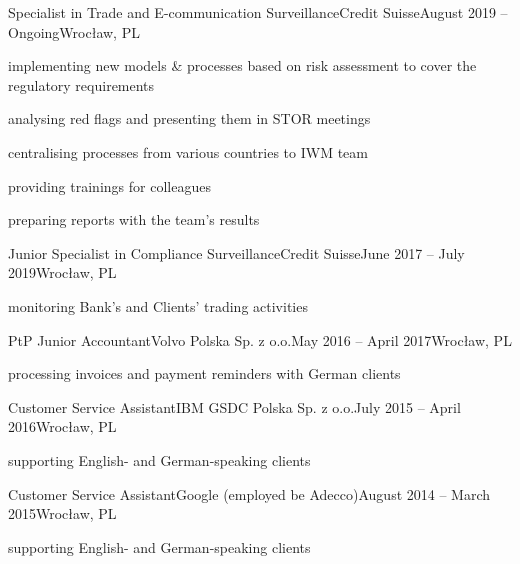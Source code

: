 
\begin{cveventi}{Specialist in Trade and E-communication Surveillance}{Credit Suisse}{August 2019 -- Ongoing}{Wroc\l aw, PL}
	\item implementing new models \& processes based on risk assessment to cover the regulatory requirements
	\item analysing red flags and presenting them in STOR meetings
	\item centralising processes from various countries to IWM team
	\item providing trainings for colleagues
	\item preparing reports with the team's results
\end{cveventi}
%
\divider
\begin{cveventis}{Junior Specialist in Compliance Surveillance}{Credit Suisse}{June 2017 -- July 2019}{Wroc\l aw, PL}
	\item monitoring Bank’s and Clients' trading activities
\end{cveventis}
%
\divider
%
\begin{cveventis}{PtP Junior Accountant}{Volvo Polska Sp. z o.o.}{May 2016 -- April 2017}{Wroc\l aw, PL}
	\item processing invoices and payment reminders with German clients
\end{cveventis}
%
\divider
%
\begin{cveventis}{Customer Service Assistant}{IBM GSDC Polska Sp. z o.o.}{July 2015 -- April 2016}{Wroc\l aw, PL}
	\item supporting English- and German-speaking clients
\end{cveventis}
%
\divider
%
\begin{cveventis}{Customer Service Assistant}{Google (employed be Adecco)}{August 2014 -- March 2015}{Wroc\l aw, PL}
	\item supporting English- and German-speaking clients
\end{cveventis}



